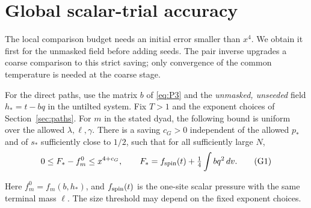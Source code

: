 \section{Global scalar-trial accuracy}
\label{sec:global}

The local comparison budget needs an initial error smaller than $x^4$.
We obtain it first for the unmasked field before adding seeds. The pair
inverse upgrades a coarse comparison to this strict saving; only
convergence of the common temperature is needed at the coarse stage.

\begin{proposition}
\label{global:trial-gap}
For the direct paths, use the matrix \(b\) of \eqref{eq:P3} and the
\emph{unmasked, unseeded} field \(h_*=t-bq\) in the untilted system.
Fix \(T>1\) and the exponent choices of Section~\ref{sec:paths}.
For \(m\) in the stated dyad, the following bound is uniform over the
allowed \(\lambda,\ell,\gamma\). There is a saving \(c_G>0\)
independent of the allowed \(p_*\) and of \(s_*\) sufficiently close
to \(1/2\), such that for all sufficiently large \(N\),
\[
 0\le F_*-f_m^0\le x^{4+c_G},\qquad
 F_*= f_{\rm spin}(t)+\tfrac14\int bq^2\,dv .                           \tag{G1}\label{eq:G1}
\]

Here \(f_m^0=f_m(b,h_*)\), and \(f_{\rm spin}(t)\) is the
one-site scalar pressure with the same terminal mass \(\ell\).
The size threshold may depend on the fixed exponent choices.
\end{proposition}

